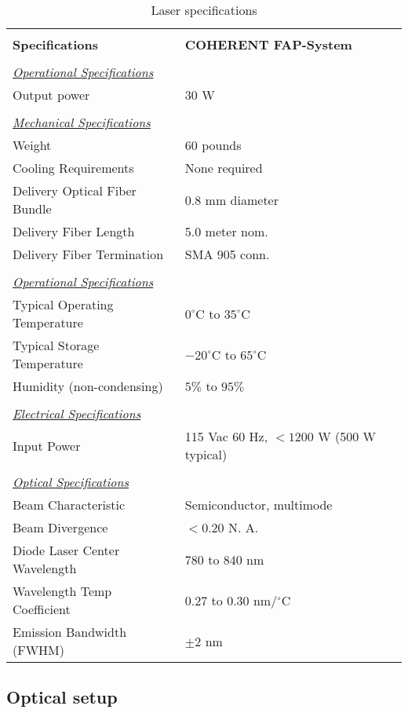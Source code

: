 {\begin{table}
\begin{center}
\begin{tabular}{|l|l|}
\hline
& \\
{\bf Specifications}&{\bf COHERENT FAP-System} \\
\hline
& \\
\underline {\it Operational Specifications}& \\
Output power			& 30 W \\
& \\
\underline {\it Mechanical Specifications}& \\
Weight			        & 60 pounds  \\
Cooling Requirements 		& None required \\
Delivery Optical Fiber Bundle   & 0.8 mm diameter \\
Delivery Fiber Length		& 5.0 meter nom.\\
Delivery Fiber Termination	& SMA 905 conn. \\
& \\
\underline {\it Operational Specifications}& \\
Typical Operating Temperature   & $0^\circ$C to $35^\circ$C \\
Typical Storage Temperature     & $-20^\circ$C to $65^\circ$C \\
Humidity (non-condensing)       & $5\%$ to $95\%$  \\
& \\
\underline {\it Electrical Specifications}& \\
Input Power	                & 115 Vac 60 Hz, $<1200$ W (500 W typical) \\
& \\
\underline {\it Optical Specifications}& \\
Beam Characteristic 		& Semiconductor, multimode \\
Beam Divergence        & $<0.20$ N. A. \\
Diode Laser Center Wavelength   & 780 to 840 nm \\
Wavelength Temp Coefficient	& 0.27 to 0.30 nm/$^\circ$C \\
Emission Bandwidth (FWHM)       & $\pm 2$ nm \\
\hline
\end{tabular}
\label{tab:speclaser}
\caption{Laser specifications}
\end{center}
\end{table}


\subsection{Optical setup}

}

